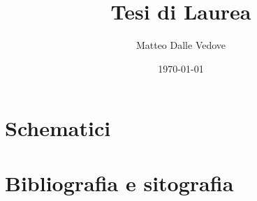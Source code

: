 \documentclass[10 pt,letterpaper,twoside,openright]{book}
\title{Tesi di Laurea}
\author{Matteo Dalle Vedove}
\date{\today}
\begin{document}
	
	\frontmatter
	\maketitle
	
	
	\tableofcontents
	
	
	
	\mainmatter
	
	
	
	
	
	
	
	
	
	\backmatter
	
	\chapter{Schematici}
	
	\chapter{Bibliografia e sitografia}
	\printbibliography[heading=none]
		
\end{document}
